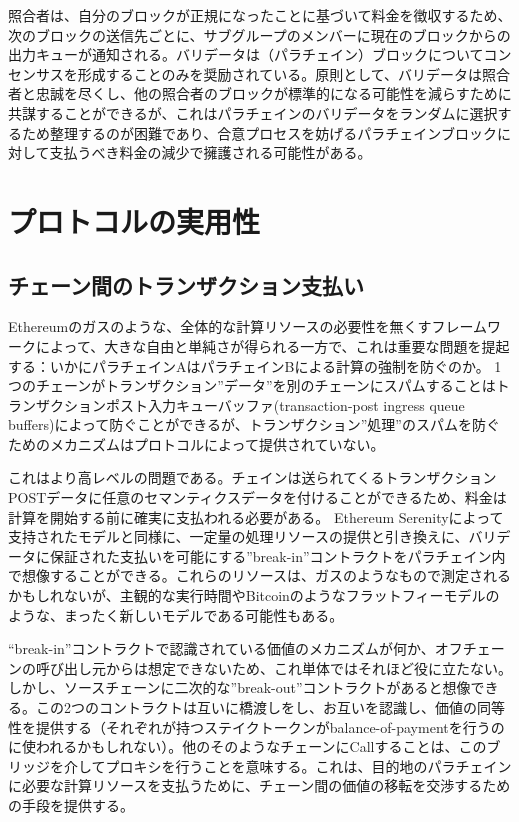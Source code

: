 照合者は、自分のブロックが正規になったことに基づいて料金を徴収するため、次のブロックの送信先ごとに、サブグループのメンバーに現在のブロックからの出力キューが通知される。バリデータは（パラチェイン）ブロックについてコンセンサスを形成することのみを奨励されている。原則として、バリデータは照合者と忠誠を尽くし、他の照合者のブロックが標準的になる可能性を減らすために共謀することができるが、これはパラチェインのバリデータをランダムに選択するため整理するのが困難であり、合意プロセスを妨げるパラチェインブロックに対して支払うべき料金の減少で擁護される可能性がある。

\hypertarget{ux30d7ux30edux30c8ux30b3ux30ebux306eux5b9fux7528ux6027}{%
\section{プロトコルの実用性}\label{ux30d7ux30edux30c8ux30b3ux30ebux306eux5b9fux7528ux6027}}

\hypertarget{ux30c1ux30a7ux30fcux30f3ux9593ux306eux30c8ux30e9ux30f3ux30b6ux30afux30b7ux30e7ux30f3ux652fux6255ux3044}{%
\subsection{チェーン間のトランザクション支払い}\label{ux30c1ux30a7ux30fcux30f3ux9593ux306eux30c8ux30e9ux30f3ux30b6ux30afux30b7ux30e7ux30f3ux652fux6255ux3044}}

Ethereumのガスのような、全体的な計算リソースの必要性を無くすフレームワークによって、大きな自由と単純さが得られる一方で、これは重要な問題を提起する：いかにパラチェインAはパラチェインBによる計算の強制を防ぐのか。
1つのチェーンがトランザクション''データ''を別のチェーンにスパムすることはトランザクションポスト入力キューバッファ(transaction-post
ingress queue
buffers)によって防ぐことができるが、トランザクション''処理''のスパムを防ぐためのメカニズムはプロトコルによって提供されていない。

これはより高レベルの問題である。チェインは送られてくるトランザクションPOSTデータに任意のセマンティクスデータを付けることができるため、料金は計算を開始する前に確実に支払われる必要がある。
Ethereum
Serenityによって支持されたモデルと同様に、一定量の処理リソースの提供と引き換えに、バリデータに保証された支払いを可能にする''break-in''コントラクトをパラチェイン内で想像することができる。これらのリソースは、ガスのようなもので測定されるかもしれないが、主観的な実行時間やBitcoinのようなフラットフィーモデルのような、まったく新しいモデルである可能性もある。

``break-in''コントラクトで認識されている価値のメカニズムが何か、オフチェーンの呼び出し元からは想定できないため、これ単体ではそれほど役に立たない。しかし、ソースチェーンに二次的な''break-out''コントラクトがあると想像できる。この2つのコントラクトは互いに橋渡しをし、お互いを認識し、価値の同等性を提供する（それぞれが持つステイクトークンがbalance-of-paymentを行うのに使われるかもしれない）。他のそのようなチェーンにCallすることは、このブリッジを介してプロキシを行うことを意味する。これは、目的地のパラチェインに必要な計算リソースを支払うために、チェーン間の価値の移転を交渉するための手段を提供する。

